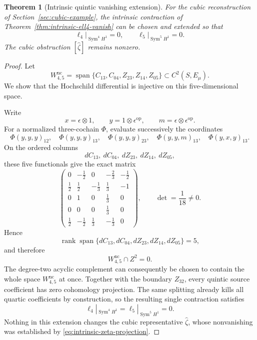 \documentclass[11pt]{amsart}
\newtheorem{theorem}{Theorem}[section]
\newcommand{\Span}{\operatorname{span}}
\newcommand{\rank}{\operatorname{rank}}
\begin{document}
\begin{theorem}[Intrinsic quintic vanishing extension]\label{thm:intrinsic-ell5-vanish}
For the cubic reconstruction of Section~\ref{sec:cubic-example}, the intrinsic contraction of Theorem~\ref{thm:intrinsic-ell4-vanish} can be chosen and extended so that
\[
\boxed{
\ell_4\big|_{\operatorname{Sym}^4H^1}=0,
\qquad
\ell_5\big|_{\operatorname{Sym}^5H^1}=0.
}
\]
The cubic obstruction $[\widehat\zeta]$ remains nonzero.
\end{theorem}

\begin{proof}
Let
\[
W_{4,5}^{\mathrm{nc}}
=
\Span\{C_{13},C_{04},Z_{23},Z_{14},Z_{05}\}
\subset C^2(S,E_\mu).
\]
We show that the Hochschild differential is injective on this five-dimensional space.

Write
\[
x=\epsilon\otimes1,
\qquad
y=1\otimes\epsilon^{\mathrm{op}},
\qquad
m=\epsilon\otimes\epsilon^{\mathrm{op}}.
\]
For a normalized three-cochain $\Phi$, evaluate successively the coordinates
\[
\Phi(y,y,y)_{12},\quad
\Phi(y,y,y)_{13},\quad
\Phi(y,y,y)_{23},\quad
\Phi(y,y,m)_{13},\quad
\Phi(y,x,y)_{13}.
\]
On the ordered columns
\[
dC_{13},\ dC_{04},\ dZ_{23},\ dZ_{14},\ dZ_{05},
\]
these five functionals give the exact matrix
\begin{equation}\label{eq:arity5-minor}
\begin{pmatrix}
0&-\tfrac12&0&-\tfrac23&-\tfrac12\\
\tfrac12&\tfrac12&-\tfrac13&\tfrac13&-1\\
0&1&0&\tfrac13&0\\
0&0&0&\tfrac13&0\\
\tfrac12&-\tfrac12&\tfrac13&-\tfrac13&0
\end{pmatrix},
\qquad
\det=\frac1{18}\ne0.
\end{equation}
Hence
\[
\rank\Span\{dC_{13},dC_{04},dZ_{23},dZ_{14},dZ_{05}\}=5,
\]
and therefore
\[
W_{4,5}^{\mathrm{nc}}\cap Z^2=0.
\]
The degree-two acyclic complement can consequently be chosen to contain the whole space $W_{4,5}^{\mathrm{nc}}$ at once.  Together with the boundary $Z_{32}$, every quintic source coefficient has zero cohomology projection.  The same splitting already kills all quartic coefficients by construction, so the resulting single contraction satisfies
\[
\ell_4|_{\operatorname{Sym}^4H^1}
=
\ell_5|_{\operatorname{Sym}^5H^1}
=0.
\]
Nothing in this extension changes the cubic representative $\widehat\zeta$, whose nonvanishing was established by \eqref{eq:intrinsic-zeta-projection}.
\end{proof}
\end{document}
